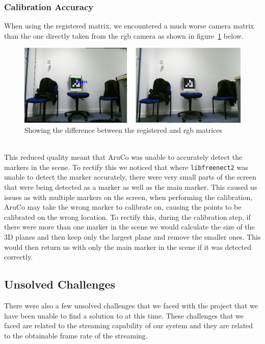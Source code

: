 \documentclass{article}
\begin{document}
\subsubsection{Calibration Accuracy}
When using the registered matrix, we encountered a much worse camera matrix than the one directly taken from the rgb camera as shown in figure~\ref{fig:registeredaccuracy} below.
\begin{figure}[h]
  \centering
  \includegraphics[scale=0.7]{registeredunregisteredview}
  \caption{Showing the difference between the registered and rgb matrices}
  \label{fig:registeredaccuracy}
\end{figure}
\\
This reduced quality meant that AruCo was unable to accurately detect the markers in the scene. To rectify this we noticed that where \texttt{libfreenect2} was unable to detect the marker accurately, there were very small parts of the screen that were being detected as a marker as well as the main marker. This caused us issues as with multiple markers on the screen, when performing the calibration, AruCo may take the wrong marker to calibrate on, causing the points to be calibrated on the wrong location. To rectify this, during the calibration step, if there were more than one marker in the scene we would calculate the size of the 3D planes and then keep only the largest plane and remove the smaller ones. This would then return us with only the main marker in the scene if it was detected correctly.

\subsection{Unsolved Challenges}
There were also a few unsolved challenges that we faced with the project that we have been unable to find a solution to at this time. These challenges that we faced are related to the streaming capability of our system and they are related to the obtainable frame rate of the streaming.
\end{document}
